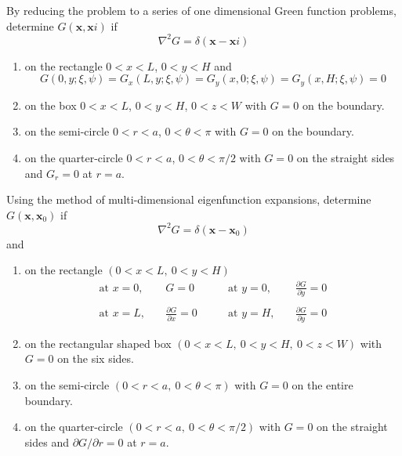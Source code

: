 {%
\begin{Exercise}
  By reducing the problem to a series of one dimensional Green function
  problems, determine $G(\mathbf{x}, \mathbf{x}i)$ if
  \[
  \nabla^2  G = \delta(\mathbf{x}-\mathbf{x}i)
  \]
  \begin{enumerate}
    \renewcommand{\labelenumi}{(\alph{enumi})}
  \item on the rectangle $0 < x < L$, $ 0 < y < H$ and
    \[
    G(0,y;\xi,\psi) = G_x(L,y;\xi,\psi) = G_y(x,0;\xi,\psi) = G_y(x,H;\xi,\psi) = 0
    \]
  \item on the box $0 < x < L$, $0 < y < H$, $0 < z < W$ with $G=0$
    on the boundary.
  \item on the semi-circle $0 < r < a$, $0 < \theta < \pi$ with $G=0$ on the
    boundary.
  \item on the quarter-circle $0 < r < a$, $0 < \theta < \pi/2$ with $G=0$ on
    the straight sides and  $G_r = 0$ at $r = a$.
  \end{enumerate}
\end{Exercise}






\begin{Exercise}
  Using the method of multi-dimensional
  eigenfunction expansions, determine $G( \mathbf{x}, \mathbf{x}_0)$ if
  \[
  \nabla^2  G = \delta(\mathbf{x}-\mathbf{x}_0)
  \]
  and
  \begin{enumerate}
    \renewcommand{\labelenumi}{(\alph{enumi})}
  \item on the rectangle $(0<x<L,~0<y<H)$
    \[
    \begin{array}{rrrr}
      \mbox{at $x = 0$}, & \quad G = 0& \qquad \mbox{at $y = 0$}, &
      \quad {\displaystyle \frac{\partial G}{\partial y} = 0} \\
      \\
      \mbox{at $x = L$}, & \quad {\displaystyle \frac{\partial
          G}{\partial x} = 0}& \qquad \mbox{at $y = H$}, &
      \quad {\displaystyle \frac{\partial G}{\partial y}} = 0
    \end{array}
    \]
  \item on the rectangular shaped box $(0<x<L,~0<y<H,~0<z<W)$ with $G=0$
    on the six sides.
  \item on the semi-circle $(0<r<a,~0<\theta<\pi)$ with $G=0$ on the
    entire boundary.
  \item on the quarter-circle $(0<r<a,~0<\theta<\pi/2)$ with $G=0$ on
    the straight sides and  $\partial G / \partial r = 0$ at $r = a$.
  \end{enumerate}
\end{Exercise}








}
